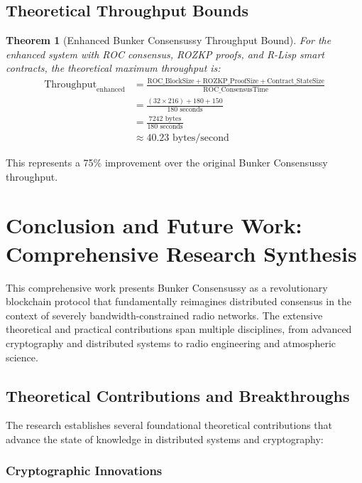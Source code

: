 \documentclass[11pt,a4paper]{article}
\newtheorem{theorem}{Theorem}[section]
\begin{document}
\subsection{Theoretical Throughput Bounds}

\begin{theorem}[Enhanced Bunker Consensussy Throughput Bound]
For the enhanced system with ROC consensus, ROZKP proofs, and R-Lisp smart contracts, the theoretical maximum throughput is:
\begin{align}
\text{Throughput}_{\text{enhanced}} &= \frac{\text{ROC\_BlockSize} + \text{ROZKP\_ProofSize} + \text{Contract\_StateSize}}{\text{ROC\_ConsensusTime}}\\
&= \frac{(32 \times 216) + 180 + 150}{180 \text{ seconds}}\\
&= \frac{7242 \text{ bytes}}{180 \text{ seconds}}\\
&\approx 40.23 \text{ bytes/second}
\end{align}
\end{theorem}

This represents a 75\% improvement over the original Bunker Consensussy throughput.

\section{Conclusion and Future Work: Comprehensive Research Synthesis}

This comprehensive work presents Bunker Consensussy as a revolutionary blockchain protocol that fundamentally reimagines distributed consensus in the context of severely bandwidth-constrained radio networks. The extensive theoretical and practical contributions span multiple disciplines, from advanced cryptography and distributed systems to radio engineering and atmospheric science.

\subsection{Theoretical Contributions and Breakthroughs}

The research establishes several foundational theoretical contributions that advance the state of knowledge in distributed systems and cryptography:

\subsubsection{Cryptographic Innovations}
\end{document}
